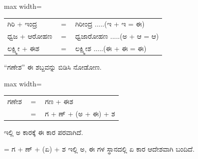 \begin{kbvderiv}
\vspace{4pt plus 3pt minus 1pt}
\begin{center}\begin{adjustbox}{max width=\textwidth}
{\renewcommand{\arraystretch}{1.22}\setlength{\tabcolsep}{4pt}
\begin{tabular}{l c l}
ಗಿರಿ + ಇಂದ್ರ & {\color{kbvgrey}$=$} & ಗಿರೀಂದ್ರ .....(ಇ + ಇ = ಈ) \\
ಧ್ವಜ + ಆರೋಹಣ & {\color{kbvgrey}$=$} & ಧ್ವಜಾರೋಹಣ .....(ಅ + ಆ = ಆ) \\
ಲಕ್ಷ್ಮೀ + ಈಶ & {\color{kbvgrey}$=$} & ಲಕ್ಷ್ಮೀಶ .....(ಈ + ಈ = ಈ) \\
\end{tabular}}
\end{adjustbox}\end{center}
\vspace{4pt plus 3pt minus 1pt}
\end{kbvderiv}

\vspace{4pt plus 4pt minus 1pt}\hspace{0.5em}“ಗಣೇಶ” ಈ ಶಬ್ದವನ್ನು ಬಿಡಿಸಿ ನೋಡೋಣ.\par

\begin{kbvderiv}
\vspace{4pt plus 3pt minus 1pt}
\begin{center}\begin{adjustbox}{max width=\textwidth}
{\renewcommand{\arraystretch}{1.22}\setlength{\tabcolsep}{4pt}
\begin{tabular}{l c l}
ಗಣೇಶ & {\color{kbvgrey}$=$} & ಗಣ + ಈಶ \\
 & {\color{kbvgrey}$=$} & ಗ + ಣ್‌ + (ಅ + ಈ) + ಶ \\
\end{tabular}}
\end{adjustbox}\end{center}
\vspace{4pt plus 3pt minus 1pt}
\end{kbvderiv}

\noindent\hspace*{2.2em}ಇಲ್ಲಿ ಅ ಕಾರಕ್ಕೆ ಈ ಕಾರ ಪರವಾಗಿದೆ.\par

\indent  = ಗ + ಣ್‌ + (ಏ) + ಶ ಇಲ್ಲಿ ಅ, ಈ ಗಳ ಸ್ಥಾನದಲ್ಲಿ ಏ ಕಾರ ಆದೇಶವಾಗಿ ಬಂದಿದೆ.\par

